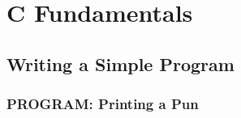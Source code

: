 


\chapter[C Fundamentals]{C Fundamentals}


\section[simple program]{Writing a Simple Program}


\subsection*{PROGRAM: Printing a Pun}




